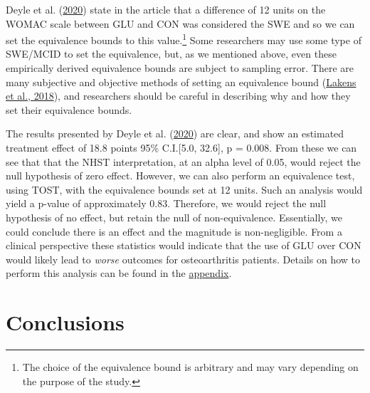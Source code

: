 \documentclass[]{cik}%
\begin{document}
Deyle et al. (\protect\hyperlink{ref-vigex}{2020}) state in the article
that a difference of 12 units on the WOMAC scale between GLU and CON was
considered the SWE and so we can set the equivalence bounds to this
value.\footnote{The choice of the equivalence bound is arbitrary and may
  vary depending on the purpose of the study.} Some researchers may use
some type of SWE/MCID to set the equivalence, but, as we mentioned
above, even these empirically derived equivalence bounds are subject to
sampling error. There are many subjective and objective methods of
setting an equivalence bound (\protect\hyperlink{ref-lakens2018}{Lakens
et al., 2018}), and researchers should be careful in describing why and
how they set their equivalence bounds.

The results presented by Deyle et al.
(\protect\hyperlink{ref-vigex}{2020}) are clear, and show an estimated
treatment effect of 18.8 points 95\% C.I.{[}5.0, 32.6{]}, p = 0.008.
From these we can see that that the NHST interpretation, at an alpha
level of 0.05, would reject the null hypothesis of zero effect. However,
we can also perform an equivalence test, using TOST, with the
equivalence bounds set at 12 units. Such an analysis would yield a
p-value of approximately 0.83. Therefore, we would reject the null
hypothesis of no effect, but retain the null of non-equivalence.
Essentially, we could conclude there is an effect and the magnitude is
non-negligible. From a clinical perspective these statistics would
indicate that the use of GLU over CON would likely lead to \emph{worse}
outcomes for osteoarthritis patients. Details on how to perform this
analysis can be found in the \protect\hyperlink{app1}{appendix}.

\hypertarget{conclusions}{%
\section{Conclusions}\label{conclusions}}
\end{document}
